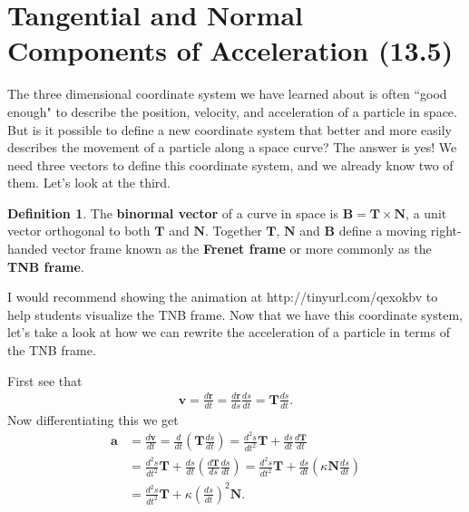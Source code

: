 \documentclass[12pt, letter]{article}
\theoremstyle{plain}
\numberwithin{theorem}{section}
\theoremstyle{definition}
\newtheorem{definition}[theorem]{Definition}
\begin{document}
\newpage


\section{Tangential and Normal Components of Acceleration (13.5)}

The three dimensional coordinate system we have learned about is often ``good enough" to describe the position, velocity, and acceleration of a particle in space. But is it possible to define a new coordinate system that better and more easily describes the movement of a particle along a space curve? The answer is yes! We need three vectors to define this coordinate system, and we already know two of them. Let's look at the third.

\bigskip

\begin{definition}
The \textbf{binormal vector} of a curve in space is $\bm{B} = \bm{T} \times \bm{N}$, a unit vector orthogonal to both $\bm{T}$ and $\bm{N}$. Together $\bm{T}$, $\bm{N}$ and $\bm{B}$ define a moving right-handed vector frame known as the \textbf{Frenet frame} or more commonly as the \textbf{TNB frame}.
\end{definition}

\bigskip

\hrulefill

\bigskip

I would recommend showing the animation at http://tinyurl.com/qexokbv to help students visualize the TNB frame. Now that we have this coordinate system, let's take a look at how we can rewrite the acceleration of a particle in terms of the TNB frame.

\bigskip

First see that
\begin{align*}
\bm{v} = \frac{d\bm{r}}{dt} = \frac{d\bm{r}}{ds}\frac{ds}{dt} = \bm{T} \frac{ds}{dt}.
\end{align*}
Now differentiating this we get
\begin{align*}
\bm{a} &= \frac{d\bm{v}}{dt} = \frac{d}{dt} \left(\bm{T} \frac{ds}{dt}\right) = \frac{d^2s}{dt^2} \bm{T} + \frac{ds}{dt} \frac{d\bm{T}}{dt}\\
&= \frac{d^2s}{dt^2} \bm{T} + \frac{ds}{dt} \left(\frac{d\bm{T}}{ds} \frac{ds}{dt}\right) = \frac{d^2s}{dt^2} \bm{T} + \frac{ds}{dt}\left(\kappa \bm{N} \frac{ds}{dt}\right)\\
&= \frac{d^2s}{dt^2} \bm{T} + \kappa \left(\frac{ds}{dt}\right)^2 \bm{N}.
\end{align*}
\end{document}
